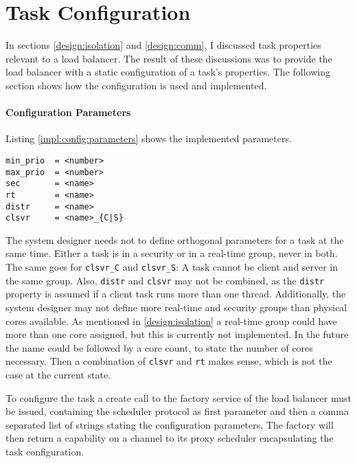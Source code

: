 \pagebreak
\section{Task Configuration}
\label{impl:config}

In sections \ref{design:isolation} and \ref{design:comm}, I discussed
task properties relevant to a load balancer.
The result of these discussions was to provide the load balancer with a static
configuration of a task's properties.
The following section shows how the configuration is used and implemented.

\paragraph{Configuration Parameters}
Listing \ref{impl:config:parameters} shows the implemented parameters.

\begin{lstlisting}[language={[5.2]Lua}, caption={Implemented set of
configuration parameters.},label={impl:config:parameters}]
min_prio  = <number>
max_prio  = <number>
sec       = <name>
rt        = <name>
distr     = <name>
clsvr     = <name>_{C|S}
\end{lstlisting}

The system designer needs not to define orthogonal parameters for
a task at the same time.
Either a task is in a security or in a real-time group, never in both.
The same goes for \texttt{clsvr\_C} and \texttt{clsvr\_S}:
A task cannot be client and server in the same group.
Also, \texttt{distr} and \texttt{clsvr} may not be combined, as the
\texttt{distr} property is assumed if a client task runs more than one thread.
Additionally, the system designer may not define more real-time and security
groups than physical cores available.
As mentioned in \ref{design:isolation} a real-time group could have more than
one core assigned, but this is currently not implemented.
In the future the name could be followed by a core count, to state the number
of cores necessary.
Then a combination of \texttt{clsvr} and \texttt{rt} makes sense, which is not
the case at the current state.

To configure the task a create call to the factory service of the load
balancer must be issued, containing the scheduler protocol as first parameter
and then a comma separated list of strings stating the configuration
parameters.
The factory will then return a capability on a channel to its proxy scheduler
encapsulating the task configuration.
\begin{comment}
Listing \ref{impl:config:proxy} shows an example for the described create call.

\begin{lstlisting}[language={[5.2]Lua},caption={Create call to the load
balancer factory containing protocol, priority band, and a client-server
group.},label={impl:config:proxy}]
tmFactory:create(
  L4.Proto.Scheduler,
  "min_prio = 0",
  "max_prio = 5",
  "clsvr = A_S")
\end{lstlisting}
\end{comment}


